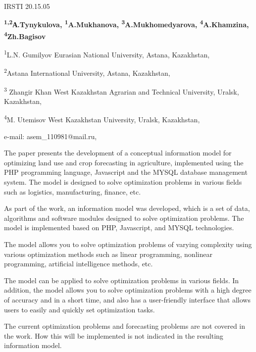 IRSTI 20.15.05


\begin{center}
{\bfseries \textsuperscript{1,2}А.Tynykulova, \textsuperscript{1}A.Mukhanova, \textsuperscript{3}A.Mukhomedyarova, \textsuperscript{4}A.Khamzina, \textsuperscript{4}Zh.Bagisov}

\textsuperscript{1}L.N. Gumilyov Eurasian National University, Astana,
Kazakhstan,

\textsuperscript{2}Astana International University, Astana, Kazakhstan,

\textsuperscript{3} Zhangir Khan West Kazakhstan Agrarian and Technical
University, Uralsk, Kazakhstan,

\textsuperscript{4}M. Utemisov West Kazakhstan University, Uralsk,
Kazakhstan,

e-mail: asem\_110981@mail.ru,
\end{center}

The paper presents the development of a conceptual information model for
optimizing land use and crop forecasting in agriculture, implemented
using the PHP programming language, Javascript and the MYSQL database
management system. The model is designed to solve optimization problems
in various fields such as logistics, manufacturing, finance, etc.

As part of the work, an information model was developed, which is a set
of data, algorithms and software modules designed to solve optimization
problems. The model is implemented based on PHP, Javascript, and MYSQL
technologies.

The model allows you to solve optimization problems of varying
complexity using various optimization methods such as linear
programming, nonlinear programming, artificial intelligence methods,
etc.

The model can be applied to solve optimization problems in various
fields. In addition, the model allows you to solve optimization problems
with a high degree of accuracy and in a short time, and also has a
user-friendly interface that allows users to easily and quickly set
optimization tasks.

The current optimization problems and forecasting problems are not
covered in the work. How this will be implemented is not indicated in
the resulting information model.

